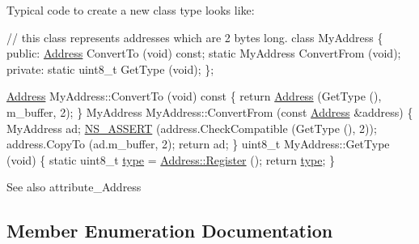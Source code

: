 Typical code to create a new class type looks like\+: 
\begin{DoxyCode}
\textcolor{comment}{// this class represents addresses which are 2 bytes long.}
\textcolor{keyword}{class }MyAddress
\{
\textcolor{keyword}{public}:
  \hyperlink{classns3_1_1Address_a9151562b6562bbbc76f459abe1f9a726}{Address} ConvertTo (\textcolor{keywordtype}{void}) \textcolor{keyword}{const};
  \textcolor{keyword}{static} MyAddress ConvertFrom (\textcolor{keywordtype}{void});
\textcolor{keyword}{private}:
  \textcolor{keyword}{static} uint8\_t GetType (\textcolor{keywordtype}{void});
\};

\hyperlink{classns3_1_1Address_a9151562b6562bbbc76f459abe1f9a726}{Address} MyAddress::ConvertTo (\textcolor{keywordtype}{void})\textcolor{keyword}{ const}
\textcolor{keyword}{}\{
  \textcolor{keywordflow}{return} \hyperlink{classns3_1_1Address_a9151562b6562bbbc76f459abe1f9a726}{Address} (GetType (), m\_buffer, 2);
\}
MyAddress MyAddress::ConvertFrom (\textcolor{keyword}{const} \hyperlink{classns3_1_1Address_a9151562b6562bbbc76f459abe1f9a726}{Address} &address)
\{
  MyAddress ad;
  \hyperlink{assert_8h_a6dccdb0de9b252f60088ce281c49d052}{NS\_ASSERT} (address.CheckCompatible (GetType (), 2));
  address.CopyTo (ad.m\_buffer, 2);
  \textcolor{keywordflow}{return} ad;
\}
uint8\_t MyAddress::GetType (\textcolor{keywordtype}{void})
\{
  \textcolor{keyword}{static} uint8\_t \hyperlink{visualizer-ideas_8txt_add98db9e15e2a58cf2b57623e7aa893a}{type} = \hyperlink{classns3_1_1Address_a75d239c79bb3c39d64a8db4f2d3d9b20}{Address::Register} ();
  \textcolor{keywordflow}{return} \hyperlink{visualizer-ideas_8txt_add98db9e15e2a58cf2b57623e7aa893a}{type};
\}
\end{DoxyCode}


\begin{DoxySeeAlso}{See also}
attribute\+\_\+\+Address 
\end{DoxySeeAlso}


\subsection{Member Enumeration Documentation}
